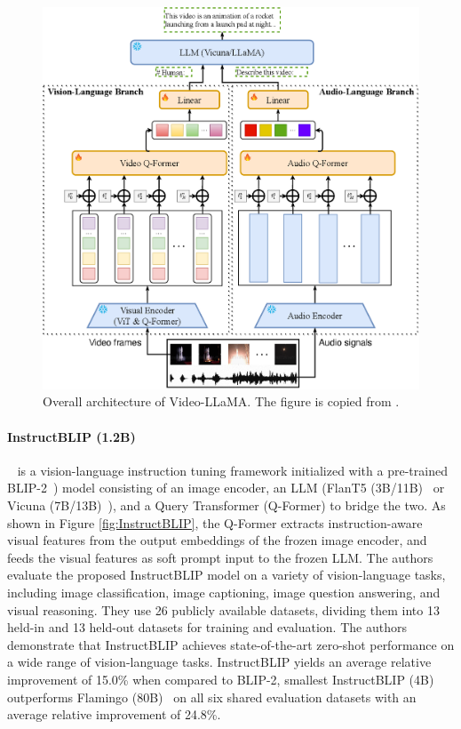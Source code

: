 \documentclass[11pt]{article}
\begin{document}
\begin{figure}[t]
  \centering
  \begin{minipage}[t]{0.5\textwidth}
    \centering
    \includegraphics[width=1\textwidth]{figures/Video-LLaMA.png}
  \end{minipage}%
  \caption{Overall architecture of Video-LLaMA. The figure is copied from \citet{damonlpsg2023videollama}.}
  \label{fig:Video-LLaMA}
\end{figure}

\paragraph{InstructBLIP (1.2B)}~\citep{Dai2023InstructBLIPTG} is a vision-language instruction tuning framework initialized with a pre-trained BLIP-2~\citep{li2023blip2}) model consisting of an image encoder, an LLM (FlanT5 (3B/11B)~\citep{Chung2022ScalingIL} or Vicuna (7B/13B)~\citep{chiang2023vicuna}), and a Query Transformer (Q-Former) to bridge the two. As shown in Figure \ref{fig:InstructBLIP}, the Q-Former extracts instruction-aware visual features from the output embeddings of the frozen image encoder, and feeds the visual features as soft prompt input to the frozen LLM. The authors evaluate the proposed InstructBLIP model on a variety of vision-language tasks, including image classification, image captioning, image question answering, and visual reasoning. They use 26 publicly available datasets, dividing them into 13 held-in and 13 held-out datasets for training and evaluation. The authors demonstrate that InstructBLIP achieves state-of-the-art zero-shot performance on a wide range of vision-language tasks. InstructBLIP yields an average relative improvement of 15.0\% when compared to BLIP-2, smallest InstructBLIP (4B) outperforms Flamingo (80B)~\citep{DBLP:conf/nips/AlayracDLMBHLMM22} on all six shared evaluation datasets with an average relative improvement of 24.8\%.
\end{document}
